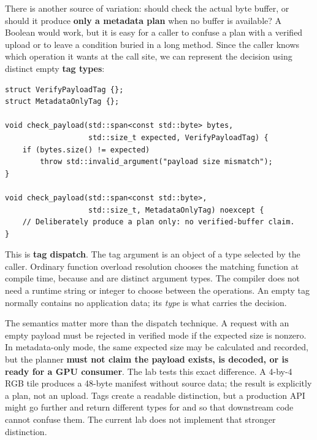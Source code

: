 \hypertarget{05-engine-i-ch005-the-same-operation-can-be-verified-or-merely-describedwithout-a-boolean-flag}{}

There is another source of variation: should  check the actual byte buffer, or should it produce \textbf{only a metadata plan} when no buffer is available? A Boolean  would work, but it is easy for a caller to confuse a plan with a verified upload or to leave a condition buried in a long method. Since the caller knows which operation it wants at the call site, we can represent the decision using distinct empty \textbf{tag types}:

\begin{verbatim}
struct VerifyPayloadTag {};
struct MetadataOnlyTag {};

void check_payload(std::span<const std::byte> bytes,
                   std::size_t expected, VerifyPayloadTag) {
    if (bytes.size() != expected)
        throw std::invalid_argument("payload size mismatch");
}

void check_payload(std::span<const std::byte>,
                   std::size_t, MetadataOnlyTag) noexcept {
    // Deliberately produce a plan only: no verified-buffer claim.
}
\end{verbatim}

This is \textbf{tag dispatch}. The tag argument is an object of a type selected by the caller. Ordinary function overload resolution chooses the matching function at compile time, because  and  are distinct argument types. The compiler does not need a runtime string or integer to choose between the operations. An empty tag normally contains no application data; its \emph{type} is what carries the decision.

The semantics matter more than the dispatch technique. A request with an empty payload must be rejected in verified mode if the expected size is nonzero. In metadata-only mode, the same expected size may be calculated and recorded, but the planner \textbf{must not claim the payload exists, is decoded, or is ready for a GPU consumer}. The lab tests this exact difference. A 4-by-4 RGB tile produces a 48-byte manifest without source data; the result is explicitly a plan, not an upload. Tags create a readable distinction, but a production API might go further and return different types for  and  so that downstream code cannot confuse them. The current lab does not implement that stronger distinction.

